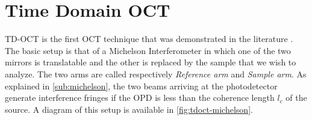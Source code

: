 %







\section{Time Domain OCT}
 \acf{TD-OCT} is the first OCT technique that was demonstrated in the literature \cite{Huang1991}. The basic setup is that of a Michelson Interferometer in which one of the two mirrors is translatable and the other is replaced by the sample that we wish to analyze. The two arms are called respectively \emph{Reference arm} and \emph{Sample arm}. As explained in \autoref{sub:michelson}, the two beams arriving at the photodetector generate interference fringes if the \ac{OPD} is less than the coherence length $l_c$ of the source. A diagram of this setup is available in \autoref{fig:tdoct-michelson}. 
 
